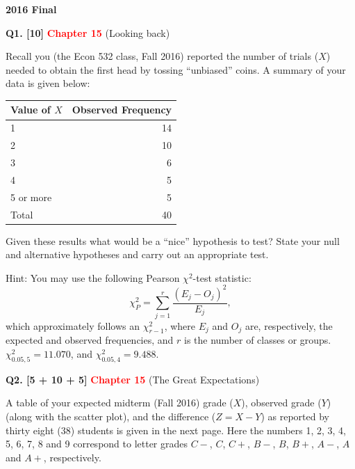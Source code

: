 \documentclass[11pt]{article}
\begin{document}
\clearpage

\begin{center}
    {\Large\bfseries 2016 Final}
\end{center}

\vspace{1em}

\textbf{Q1. [10]} \textbf{\textcolor{red}{Chapter 15}} (Looking back)

Recall you (the Econ 532 class, Fall 2016) reported the number of trials ($X$) needed to obtain the first head by tossing ``unbiased'' coins. A summary of your data is given below:

\begin{center}
\begin{tabular}{lr}
\hline
Value of $X$ & Observed Frequency \\
\hline
1 & 14 \\
2 & 10 \\
3 & 6 \\
4 & 5 \\
5 or more & 5 \\
Total & 40 \\
\hline
\end{tabular}
\end{center}

Given these results what would be a ``nice'' hypothesis to test? State your null and alternative hypotheses and carry out an appropriate test.

Hint: You may use the following Pearson $\chi^2$-test statistic:
\[
\chi_P^2=\sum_{j=1}^{r}\frac{(E_j-O_j)^2}{E_j},
\]
which approximately follows an $\chi^2_{r-1}$, where $E_j$ and $O_j$ are, respectively, the expected and observed frequencies, and $r$ is the number of classes or groups. $\chi^2_{0.05,5}=11.070$, and $\chi^2_{0.05,4}=9.488$.

\bigskip

\textbf{Q2. [5 + 10 + 5]} \textbf{\textcolor{red}{Chapter 15}} (The Great Expectations)

A table of your expected midterm (Fall 2016) grade ($X$), observed grade ($Y$) (along with the scatter plot), and the difference ($Z=X-Y$) as reported by thirty eight (38) students is given in the next page. Here the numbers 1, 2, 3, 4, 5, 6, 7, 8 and 9 correspond to letter grades $C-$, $C$, $C+$, $B-$, $B$, $B+$, $A-$, $A$ and $A+$, respectively.
\end{document}
